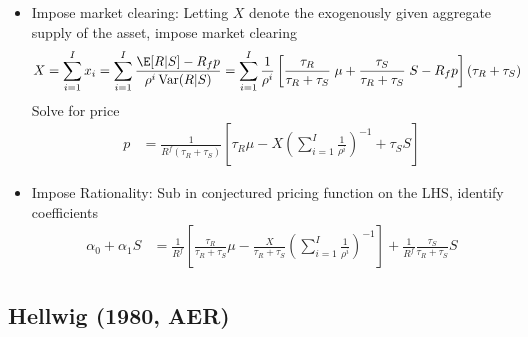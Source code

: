 \documentclass[12pt]{article}
\theoremstyle{plain}
\theoremstyle{definition}
\theoremstyle{remark}
\newcommand{\Var}{\operatorname{Var}}
\begin{document}
\begin{itemize}
  \item
    Impose market clearing:
    Letting $X$ denote the exogenously given aggregate supply of the
    asset, impose market clearing
    \begin{align*}
      X
      =
      \sum_{i=1}^I x_i
      &=
      \sum_{i=1}^I
      \frac{\E[R|S]-R_fp}{\rho^i \Var(R|S)}
      =
      \sum_{i=1}^I
      \frac{1 }{\rho^i}
      \left[
        \frac{\tau_R}{\tau_R+\tau_{S}}
        \;\mu
        + \frac{\tau_{S}}{\tau_R+\tau_{S}}
        \;
        S
        -R_fp
      \right]
      (\tau_R+\tau_{S})
    \end{align*}
    Solve for price
    \begin{align*}
      p
      &=
      \frac{1}{R^f(\tau_R+\tau_S)}
      \left[
      \tau_R \mu
      - X
      \left(
      \sum_{i=1}^I
      \frac{1 }{\rho^i}
      \right)^{-1}
      + \tau_{S} S
      \right]
    \end{align*}
  \item
    Impose Rationality:
    Sub in conjectured pricing function on the LHS, identify
    coefficients
    \begin{align*}
      \alpha_0 + \alpha_1 S
      &=
      \frac{1}{R^f}
      \left[
      \frac{\tau_R}{\tau_R+\tau_S}
       \mu
      -
      \frac{X}{\tau_R+\tau_S}
      \left(
      \sum_{i=1}^I
      \frac{1 }{\rho^i}
      \right)^{-1}
      \right]
      +
      \frac{1}{R^f}
      \frac{\tau_{S}}{\tau_R+\tau_S}
      S
    \end{align*}




\end{itemize}







\clearpage
\subsection{Hellwig (1980, AER)}
\end{document}
